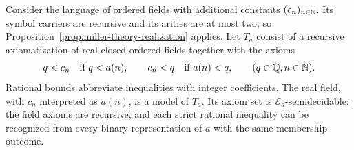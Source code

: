 Consider the language of ordered fields with additional constants
$(c_n)_{n\in\mathbb N}$. Its symbol carriers are recursive and its arities
are at most two, so Proposition~\ref{prop:miller-theory-realization}
applies. Let $T_a$ consist of a recursive axiomatization of
real closed ordered fields together with the axioms
\begin{equation}\label{eq:miller-theory}
 q<c_n\quad\text{if }q<a(n),\qquad
 c_n<q\quad\text{if }a(n)<q,
 \qquad(q\in\mathbb Q, n\in\mathbb N).
\end{equation}
Rational bounds abbreviate inequalities with integer coefficients.
The real field, with $c_n$ interpreted as $a(n)$, is a model of $T_a$.
Its axiom set is $\mathcal E_a$-semidecidable: the field axioms are
recursive, and each strict rational inequality can be recognized from
every binary representation of $a$ with the same membership outcome.

